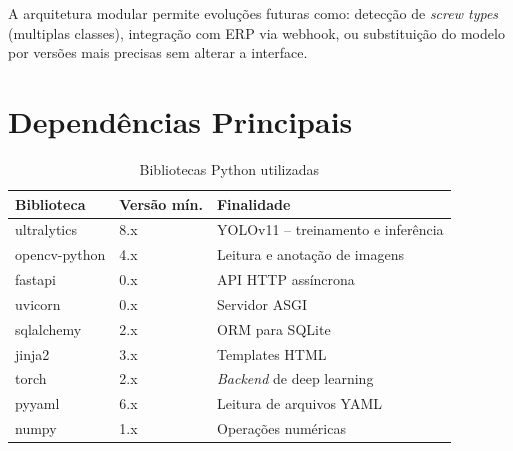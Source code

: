 \documentclass[12pt,a4paper]{article}
\begin{document}
A arquitetura modular permite evolu\c{c}\~oes futuras como: detec\c{c}\~ao de
\emph{screw types} (multiplas classes), integra\c{c}\~ao com ERP via webhook, ou
substitui\c{c}\~ao do modelo por vers\~oes mais precisas sem alterar a interface.

\appendix
\section{Depend\^encias Principais}

\begin{table}[H]
  \centering
  \caption{Bibliotecas Python utilizadas}
  \begin{tabular}{lll}
    \toprule
    \textbf{Biblioteca} & \textbf{Vers\~ao m\'in.} & \textbf{Finalidade} \\
    \midrule
    ultralytics  & 8.x  & YOLOv11 -- treinamento e infer\^encia \\
    opencv-python & 4.x & Leitura e anota\c{c}\~ao de imagens \\
    fastapi      & 0.x  & API HTTP ass\'incrona \\
    uvicorn      & 0.x  & Servidor ASGI \\
    sqlalchemy   & 2.x  & ORM para SQLite \\
    jinja2       & 3.x  & Templates HTML \\
    torch        & 2.x  & \emph{Backend} de deep learning \\
    pyyaml       & 6.x  & Leitura de arquivos YAML \\
    numpy        & 1.x  & Opera\c{c}\~oes num\'ericas \\
    \bottomrule
  \end{tabular}
\end{table}
\end{document}

